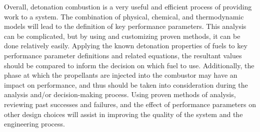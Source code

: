 Overall, detonation combustion is a very useful and efficient process of providing work to a system. The combination of physical, chemical, and thermodynamic models will lead to the definition of key performance parameters. This analysis can be complicated, but by using and customizing proven methods, it can be done relatively easily. Applying the known detonation properties of fuels to key performance parameter definitions and related equations, the resultant values should be compared to inform the decision on which fuel to use. Additionally, the phase at which the propellants are injected into the combustor may have an impact on performance, and thus should be taken into consideration during the analysis and/or decision-making process. Using proven methods of analysis, reviewing past successes and failures, and the effect of performance parameters on other design choices will assist in improving the quality of the system and the engineering process.